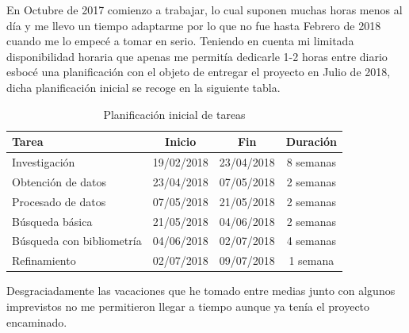 En Octubre de 2017 comienzo a trabajar, lo cual suponen muchas horas menos al día y me llevo un tiempo adaptarme por lo que no fue hasta Febrero de 2018 cuando me lo empecé a tomar en serio. Teniendo en cuenta mi limitada disponibilidad horaria que apenas me permitía dedicarle 1-2 horas entre diario esbocé una planificación con el objeto de entregar el proyecto en Julio de 2018, dicha planificación inicial se recoge en la siguiente tabla.

\begin{table} [h!]
	\centering
	\begin{tabular}{l c c c}
		\hline
		\textbf{Tarea} & \textbf{Inicio} & \textbf{Fin} & \textbf{Duración}\\
		\hline\hline
		Investigación & 19/02/2018 & 23/04/2018 & 8 semanas \\
		\hline
		Obtención de datos & 23/04/2018 & 07/05/2018 & 2 semanas\\
		\hline
		Procesado de datos & 07/05/2018 & 21/05/2018 & 2 semanas\\
		\hline
		Búsqueda básica & 21/05/2018 & 04/06/2018 & 2 semanas\\
		\hline
		Búsqueda con bibliometría & 04/06/2018 & 02/07/2018 & 4 semanas\\
		\hline
		Refinamiento & 02/07/2018 & 09/07/2018 & 1 semana\\
		\hline
	
	\end{tabular}
	\caption{Planificación inicial de tareas}
\end{table}

Desgraciadamente las vacaciones que he tomado entre medias junto con algunos imprevistos no me permitieron llegar a tiempo aunque ya tenía el proyecto encaminado.
